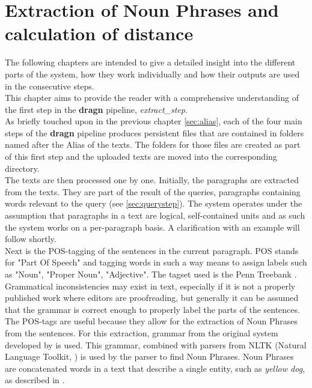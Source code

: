 \section{Extraction of Noun Phrases and calculation of distance}
\label{sec:extract}
The following chapters are intended to give a detailed insight into the different parts of the system, how they work individually and how their outputs are used in the consecutive steps.\\
This chapter aims to provide the reader with a comprehensive understanding of the first step in the \textbf{dragn} pipeline, \textit{extract\_step}.\\
As briefly touched upon in the previous chapter \ref{sec:alias}, each of the four main steps of the \textbf{dragn} pipeline produces persistent files that are contained in folders named after the Alias of the texts. The folders for those files are created as part of this first step and the uploaded texts are moved into the corresponding directory.\\
The texts are then processed one by one. Initially, the paragraphs are extracted from the texts. They are part of the result of the queries, paragraphs containing words relevant to the query (see \ref{sec:querystep}). The system operates under the assumption that paragraphs in a text are logical, self-contained units and as such the system works on a per-paragraph basis. A clarification with an example will follow shortly.\\
Next is the POS-tagging of the sentences in the current paragraph. POS stands for "Part Of Speech" and tagging words in such a way means to assign labels such as "Noun", "Proper Noun", "Adjective". The tagset used is the Penn Treebank \cite{marcus1993building}.
Grammatical inconsistencies may exist in text, especially if it is not a properly published work where editors are proofreading, but generally it can be assumed that the grammar is correct enough to properly label the parts of the sentences.\\
The POS-tags are useful because they allow for the extraction of Noun Phrases from the sentences. For this extraction, grammar from the original system developed by \cite{novavcek2014skimmr} is used. This grammar, combined with parsers from NLTK (Natural Language Toolkit, \cite{bird2009natural}) is used by the parser to find Noun Phrases. Noun Phrases are concatenated words in a text that describe a single entity, such as \textit{yellow dog}, as described in \cite{abney1987english}.\\
